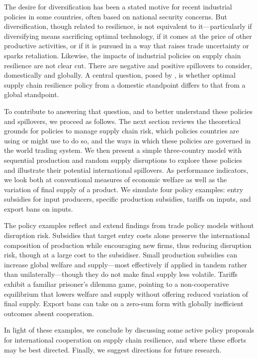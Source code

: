 \documentclass{article}
\begin{document}
The desire for diversification has been a stated motive for recent industrial policies in some countries, often based on national security concerns. But diversification, though related to resilience, is not equivalent to it---particularly if diversifying means sacrificing optimal technology, if it comes at the price of other productive activities, or if it is pursued in a way that raises trade uncertainty or sparks retaliation. Likewise, the impacts of industrial policies on supply chain resilience are not clear cut. There are negative and positive spillovers to consider, domestically and globally. A central question, posed by \textcite{bown_modern_2024}, is whether optimal supply chain resilience policy from a domestic standpoint differs to that from a global standpoint.

To contribute to answering that question, and to better understand these policies and spillovers, we proceed as follows. The next section reviews the theoretical grounds for policies to manage supply chain risk, which policies countries are using or might use to do so, and the ways in which these policies are governed in the world trading system. We then present a simple three-country model with sequential production and random supply disruptions to explore these policies and illustrate their potential international spillovers. As performance indicators, we look both at conventional measures of economic welfare as well as the variation of final supply of a product. We simulate four policy examples: entry subsidies for input producers, specific production subsidies, tariffs on inputs, and export bans on inputs.

The policy examples reflect and extend findings from trade policy models without disruption risk. Subsidies that target entry costs alone preserve the international composition of production while encouraging new firms, thus reducing disruption risk, though at a large cost to the subsidiser. Small production subsidies can increase global welfare and supply---most effectively if applied in tandem rather than unilaterally---though they do not make final supply less volatile. Tariffs exhibit a familiar prisoner's dilemma game, pointing to a non-cooperative equilibrium that lowers welfare and supply without offering reduced variation of final supply. Export bans can take on a zero-sum form with globally inefficient outcomes absent cooperation.

In light of these examples, we conclude by discussing some active policy proposals for international cooperation on supply chain resilience, and where these efforts may be best directed. Finally, we suggest directions for future research.
\end{document}
